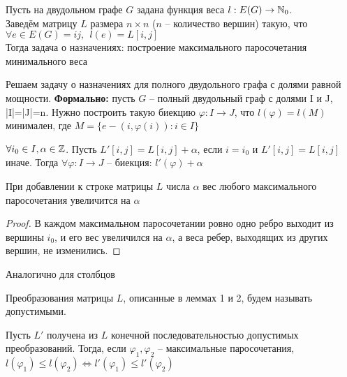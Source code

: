 	\begin{Thm}
		Пусть на двудольном графе $G$ задана функция веса $l: E(G) \to \mathbb{N}_0$.\\
		Заведём матрицу $L$ размера $n \times n$ ($n$ -- количество вершин) такую, что 
		$\forall e \in E(G) = ij, \ \ l(e) = L[i,j]$\\
		Тогда задача о назначениях: построение максимального паросочетания минимального веса
	\end{Thm}
	
	\begin{Rem}
		Решаем задачу о назначениях для полного двудольного графа с долями равной мощности. 
		\textbf{Формально:} пусть $G$ -- полный двудольный граф с долями I и J, 
		|I|=|J|=n. Нужно построить такую биекцию $\varphi: I \to J$, что $l(\varphi) = l(M)$ минимален,
		где $M = \{e - (i, \varphi(i)): i \in I\}$  
	\end{Rem}


	\begin{Lm}
		$\forall i_0 \in I, \alpha \in \mathbb{Z}$. Пусть $L'[i,j] = L[i,j] + \alpha$, если $i = i_0$ и
		$L'[i,j] = L[i,j]$ иначе. Тогда $\forall \varphi: I \to J$ -- биекция: $l'(\varphi) + \alpha$
	\end{Lm}

	\begin{Rem}
		При добавлении к строке матрицы $L$ числа $\alpha$ вес любого максимального паросочетания
		увеличится на $\alpha$ 
	\end{Rem}

	\begin{proof}
		В каждом максимальном паросочетании ровно одно ребро выходит из вершины $i_0$, и его вес 
		увеличился на $\alpha$, а веса ребер, выходящих из других вершин, не изменились. 
	\end{proof}

	\begin{Lm}
		Аналогично для столбцов
	\end{Lm}

	\begin{Def}
		Преобразования матрицы $L$, описанные в леммах 1 и 2, будем называть допустимыми. 
	\end{Def}

	\begin{Rem}
		Пусть $L'$ получена из $L$ конечной последовательностью допустимых преобразований. Тогда, если
		$\varphi_1, \varphi_2$ -- максимальные паросочетания, $l(\varphi_1) \leqslant l(\varphi_2)
		\Leftrightarrow l'(\varphi_1) \leqslant l'(\varphi_2)$
	\end{Rem}

